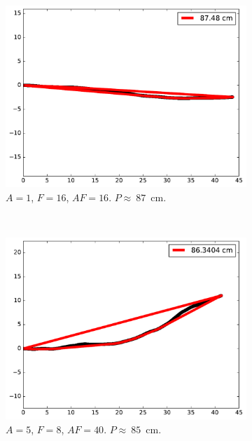 	\begin{figure}[htb]
		\centering
		\begin{subfigure}[t]{\subImgWmo}
			\centering
			\includegraphics[width=\textwidth]{figures/ch3/areaTraj_2_19_1_16}
			\caption{$A = 1$, $F=16$, $AF=16$. $P\approx~87$~cm.}
			\label{fig:areaTraj_2_19_1_16}
		\end{subfigure}
		~
		\begin{subfigure}[t]{\subImgWmo}
			\centering
			\includegraphics[width=\textwidth]{figures/ch3/areaTraj_2_19_5_8}
			\caption{$A = 5$, $F=8$, $AF=40$. $P\approx~85$~cm.}
			\label{fig:areaTraj_2_19_5_8}
		\end{subfigure}
		~
		\begin{subfigure}[t]{\subImgWmo}

\end{subfigure}
\end{figure}
